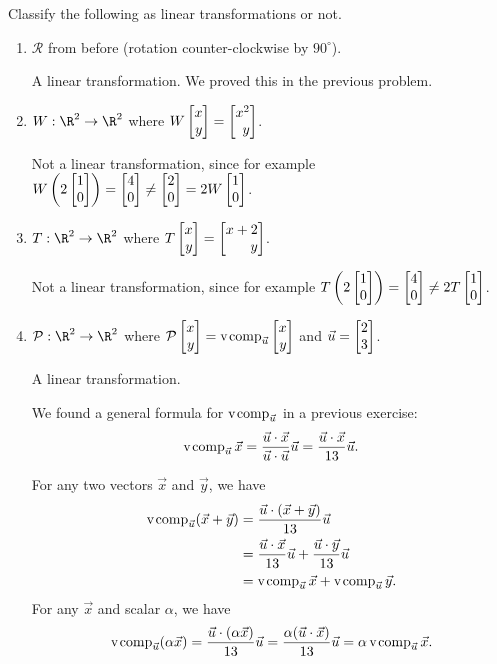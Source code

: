 	\begin{parts}
		\item Classify the following as linear transformations or not.
			\begin{enumerate}
				\item $\mathcal R$ from before (rotation counter-clockwise by $90^\circ$).
					\begin{solution}
						A linear transformation. We proved this in the previous problem.
					\end{solution}
				\item $W:\R^2\to\R^2$ where $W\mat{x\\y}=\mat{x^2\\y}$.
					\begin{solution}
						Not a linear transformation, since for example
						$W\left(2\mat{1\\0}\right)=\mat{4\\0}\neq\mat{2\\0}=2W\mat{1\\0}$.
					\end{solution}
				\item $T:\R^2\to\R^2$ where $T\mat{x\\y}=\mat{x+2\\y}$.
					\begin{solution}
						Not a linear transformation, since for example
						$T\left(2\mat{1\\0}\right) = \mat{4\\0} \neq 2T\mat{1\\0}$.
					\end{solution}
				\item $\mathcal P:\R^2\to\R^2$ where
					$\mathcal P\mat{x\\y}=\Comp_{\vec u}\mat{x\\y}$ and
					$\vec u=\mat{2\\3}$.
					\begin{solution}
						A linear transformation.

						We found a general formula for $\operatorname{\operatorname{v\hspace{1pt}comp}}_{\vec u}$ in a previous
						exercise:
						\[
							\operatorname{\operatorname{v\hspace{1pt}comp}}_{\vec u}\vec x
							=\frac{\vec u\cdot\vec x}{\vec u\cdot\vec u}\vec u
							=\frac{\vec u\cdot\vec x}{13}\vec u.
						\]

						For any two vectors $\vec x$ and $\vec y$, we have
						\begin{align*}
							\operatorname{\operatorname{v\hspace{1pt}comp}}_{\vec u}(\vec x + \vec y)&=\frac{\vec u\cdot(\vec x + \vec y)}{13}\vec u\\
							&=\frac{\vec u\cdot\vec x}{13}\vec u + \frac{\vec u\cdot\vec y}{13}\vec u\\
							&=\operatorname{\operatorname{v\hspace{1pt}comp}}_{\vec u}\vec x + \operatorname{\operatorname{v\hspace{1pt}comp}}_{\vec u}\vec y.
						\end{align*}
						For any $\vec x$ and scalar $\alpha$, we have
						\[
							\operatorname{\operatorname{v\hspace{1pt}comp}}_{\vec u}(\alpha\vec x)
							=\frac{\vec u\cdot(\alpha\vec x)}{13}\vec u
							=\frac{\alpha(\vec u\cdot\vec x)}{13}\vec u
							=\alpha\operatorname{\operatorname{v\hspace{1pt}comp}}_{\vec u}\vec x.
						\]
					\end{solution}
			\end{enumerate}
	\end{parts}

